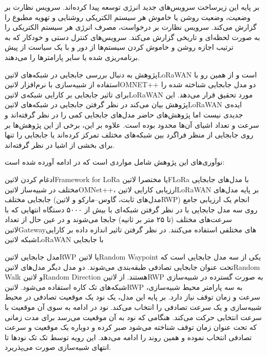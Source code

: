 بر پایه این زیرساخت سرویس‌های جدید انرژی توسعه پیدا کرده‌اند. سرویس نظارت بر وضعیت، وضعیت روشن یا خاموش هر سیستم الکتریکی روشنایی و تهویه مطبوع را
گزارش می‌کند. سرویس نظارت بر درخواست، مصرف انرژی هر سیستم الکتریکی را به صورت لحظه‌ای و تاریخی گزارش می‌کند. سرویس‌های کنترل دستی و خودکار که به ترتیب
اجازه روشن و خاموش کردن سیستم‌ها از دور و با یک سیاست از پیش برنامه‌ریزی شده یا سایر پارامترها را می‌دهند.


پژوهش  به دنبال بررسی جابجایی در شبکه‌های ‌لاتین{LoRaWAN} است و از همین رو با استفاده از شبیه‌سازی با نرم‌افزار ‌لاتین{OMNET++}
دو مدل جابجایی شناخته شده را برای تاثیر جابجایی بر کارایی شبکه‌ی ‌لاتین{LoRaWAN} مورد تحقیق قرار می‌دهد. این پژوهش بیان می‌کند در نظر گرفتن جابجایی در شبکه‌های
‌لاتین{LoRaWAN} ایده‌ی جدیدی نیست اما پژوهش‌های حاضر مدل‌های جابجایی کمی را در نظر گرفته‌اند و سرعت و تعداد اشیای آن‌ها محدود بوده است.
علاوه بر این، برخی از این پژوهش‌ها بر روی جابجایی از منظر فراگرد بین شبکه‌های مختلف تمرکز کرده‌اند یا جابجایی را تنها برای بخشی از اشیا در نظر گرفته‌اند.

نوآوری‌های این پژوهش شامل مواردی است که در ادامه آورده شده است:

 ادغام کردن ‌لاتین{Framework for LoRa} یا مختصرا ‌لاتین{FLoRa} با مدل‌های جابجایی مختلف در شبیه‌ساز ‌لاتین{OMNet++}،
 ارزیابی کارایی ‌لاتین{LoRaWAN} بر پایه مدل‌های جابجایی مختلف (مدل‌های ثابت، گاوس--مارکو و ‌لاتین{RWP})
 انجام یک ارزیابی جامع روی سه مدل جابجایی با در نظر گرفتن شبکه‌ای با بیش از ۵۰۰۰ دستگاه انتهایی که با سرعت‌های مختلف (تا ۲۵ متر بر ثانیه) جابجا می‌شوند و در عین حال از تعداد
‌لاتین{Gateway}های مختلفی استفاده می‌کنند.
 در نظر گرفتن تاثیر اندازه داده بر کارایی شبکه ‌لاتین{LoRaWAN} با جابجایی

مدل جابجایی ‌لاتین{RWP} یا ‌لاتین{Random Waypoint} یکی از سه مدل جابجایی است که تحت عنوان جابجایی تصادفی طبقه‌بندی می‌شوند.
دو مدل دیگر مدل‌های ‌لاتین{Random Walk} و ‌لاتین{Random Direction} هستند.
از ‌لاتین{RWP} به صورت گسترده در شبیه‌سازی شبکه‌های تک کاره استفاده می‌شود.
‌لاتین{RWP} به سه پارامتر محیط شبیه‌سازی، سرعت و زمان توقف نیاز دارد.
بر پایه این مدل، یک نود یک موقعیت تصادفی در محیط شبیه‌سازی و یک سرعت تصادفی را انتخاب می‌کند.
نود در ادامه به سوی آن موقعیت با سرعت انتخابی حرکت می‌کند. هنگامی که نود به آن موقعیت می‌رسد برای مدت زمانی که تحت عنوان زمان توقف
شناخته می‌شود صبر کرده و دوباره یک موقعیت و سرعت تصادفی انتخاب نموده و همین روند را ادامه می‌دهد. این رویه توسط تک تک نودها تا انتهای
شبیه‌سازی صورت می‌پذریرد.


